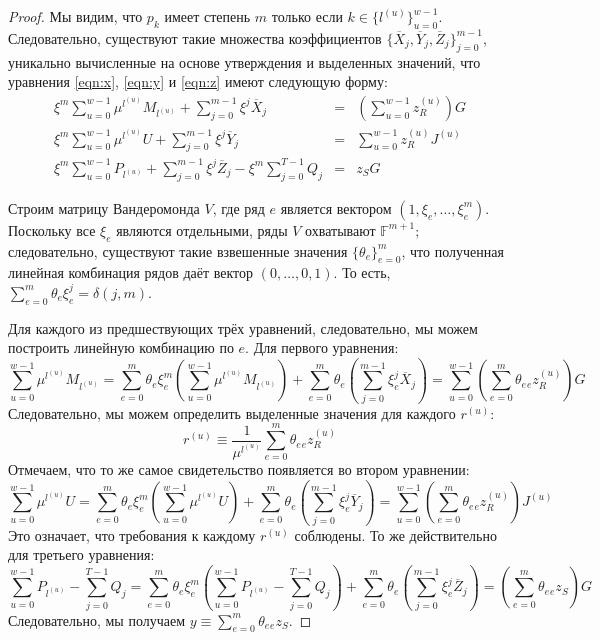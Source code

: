 \documentclass{article}
\newcommand{\F}{\mathbb{F}}
\newcommand{\sumj}{\sum_{j=0}^{m-1}}
\newcommand{\sumu}{\sum_{u=0}^{w-1}}
\theoremstyle{definition}
\begin{document}
\begin{proof}
Мы видим, что $p_k$ имеет степень $m$ только если $k \in \{l^{(u)}\}_{u=0}^{w-1}$.
Следовательно, существуют такие множества коэффициентов $\{\overline{X}_j,\overline{Y}_j,\overline{Z}_j\}_{j=0}^{m-1}$, уникально вычисленные на основе утверждения и выделенных значений, что уравнения \ref{eqn:x}, \ref{eqn:y} и \ref{eqn:z} имеют следующую форму:
\begin{eqnarray*}
\xi^m \sumu \mu^{l^{(u)}}M_{l^{(u)}} + \sumj \xi^j\overline{X}_j &=& \left( \sumu z^{(u)}_R \right)G \\
\xi^m \sumu \mu^{l^{(u)}}U + \sumj \xi^j\overline{Y}_j &=& \sumu z^{(u)}_RJ^{(u)} \\
\xi^m \sumu P_{l^{(u)}} + \sumj \xi^j\overline{Z}_j - \xi^m \sum_{j=0}^{T-1} Q_j &=& z_SG
\end{eqnarray*}

Строим матрицу Вандеромонда $V$, где ряд $e$ является вектором $(1,\xi_e,\ldots,\xi^m_e)$.
Поскольку все $\xi_e$ являются отдельными, ряды $V$ охватывают $\F^{m+1}$; следовательно, существуют такие взвешенные значения $\{\theta_e\}_{e=0}^m$, что полученная линейная комбинация рядов даёт вектор $(0,\ldots,0,1)$.
То есть, $\sum_{e=0}^m \theta_e\xi_e^j = \delta(j,m)$.

Для каждого из предшествующих трёх уравнений, следовательно, мы можем построить линейную комбинацию по $e$. Для первого уравнения:
$$\sumu \mu^{l^{(u)}} M_{l^{(u)}} = \sum_{e=0}^m \theta_e\xi_e^m \left( \sumu \mu^{l^{(u)}} M_{l^{(u)}} \right) + \sum_{e=0}^m \theta_e \left( \sumj \xi_e^j \overline{X}_j \right) = \sumu \left( \sum_{e=0}^m \theta_e {}_ez^{(u)}_R \right) G$$
Следовательно, мы можем определить выделенные значения для каждого $r^{(u)}$:
$$r^{(u)} \equiv \frac{1}{\mu^{l^{(u)}}} \sum_{e=0}^m \theta_e {}_ez^{(u)}_R$$
Отмечаем, что то же самое свидетельство появляется во втором уравнении:
$$\sumu \mu^{l^{(u)}} U = \sum_{e=0}^m \theta_e\xi_e^m \left( \sumu \mu^{l^{(u)}} U \right) + \sum_{e=0}^m \theta_e \left( \sumj \xi_e^j \overline{Y}_j \right) = \sumu \left( \sum_{e=0}^m \theta_e {}_ez^{(u)}_R \right) J^{(u)}$$
Это означает, что требования к каждому $r^{(u)}$ соблюдены. То же действительно для третьего уравнения:
$$\sumu P_{l^{(u)}} - \sum_{j=0}^{T-1} Q_j = \sum_{e=0}^m \theta_e\xi_e^m \left( \sumu P_{l^{(u)}} - \sum_{j=0}^{T-1} Q_j \right) + \sum_{e=0}^m \theta_e \left( \sumj \xi_e^j \overline{Z}_j \right) = \left( \sum_{e=0}^m \theta_e {}_ez_S  \right)G$$
Следовательно, мы получаем $y \equiv \sum_{e=0}^m \theta_e {}_ez_S$.
\end{proof}
\end{document}
